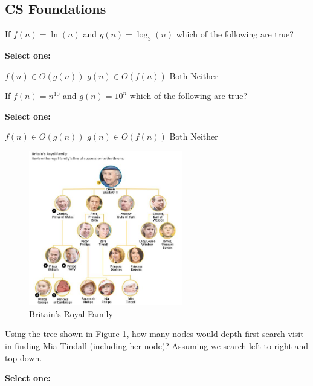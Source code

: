 \documentclass[11pt,addpoints,answers]{exam}
\numberwithin{equation}{section} %
\numberwithin{figure}{section} %
\numberwithin{table}{section} %
\begin{document}
\subsection{CS Foundations}
\begin{questions}
    \question[1] If $f(n)=\ln(n)$ and $g(n)=\log_3(n)$ which of the following are true?

    \textbf{Select one:}
    \begin{checkboxes}
        \choice $f(n) \in O(g(n))$
        \choice $g(n) \in O(f(n))$
        \choice Both 
        \choice Neither
    \end{checkboxes}


    \question[1] If $f(n)=n^{10}$ and $g(n)=10^n$ which of the following are true?

    \textbf{Select one:}
    \begin{checkboxes}
        \choice $f(n) \in O(g(n))$
        \choice $g(n) \in O(f(n))$
        \choice Both
        \choice Neither
    \end{checkboxes}


    \begin{figure}[H]
        \centering
        \includegraphics[width=0.6\textwidth]{BritiansRoyalFamily.jpg}
        \caption{Britain's Royal Family}
        \label{fig:family}
    \end{figure}
    \clearpage
    
    \question[2] Using the tree shown in Figure \ref{fig:family}, how many nodes would depth-first-search visit in finding Mia Tindall (including her node)? Assuming we search left-to-right and top-down.

    \textbf{Select one:}
    \begin{checkboxes}
    \end{checkboxes}


\end{questions}
\end{document}
